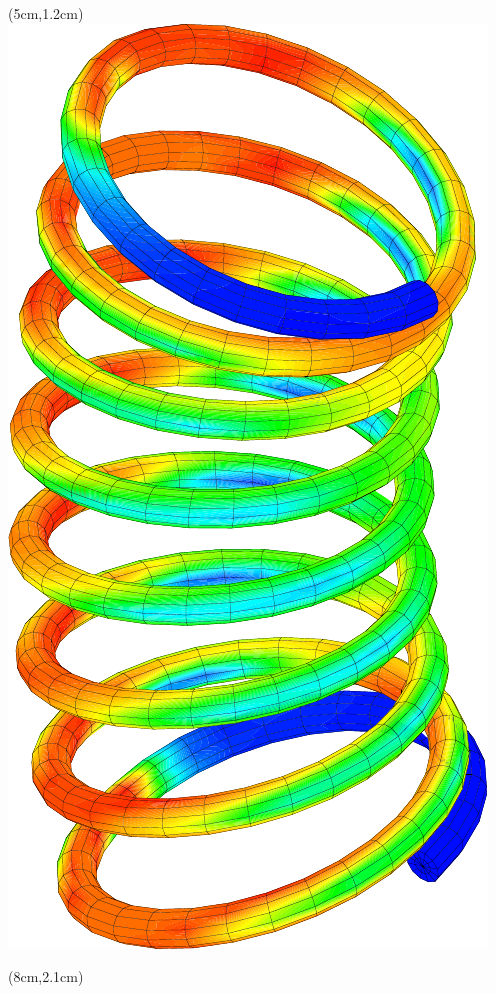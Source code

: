 \begin{frame}{}
{\begin{itemize}
{{\begin{textblock*}{5cm}
      \end{textblock*}
      \begin{textblock*}{5cm}(5cm,1.2cm)
        \includegraphics[height=0.4\textheight]{images/ressort}
      \end{textblock*}
      \begin{textblock*}{5cm}(8cm,2.1cm)

\end{textblock*}}}
\end{itemize}}
\end{frame}
